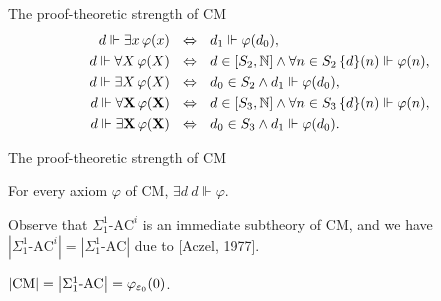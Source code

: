 \documentclass{beamer}
\begin{document}
\begin{frame}{The proof-theoretic strength of $\mathrm{CM}$}
{\begin{align*}
      d \Vdash \exists x \, \varphi\mleft(x\mright) \ \                    & \ratio\Leftrightarrow \ \ d_1 \Vdash \varphi\mleft(d_0\mright),                                                                                                \\
      d \Vdash \forall X \, \varphi\mleft(X\mright) \ \                    & \ratio\Leftrightarrow \ \ d \in \left[S_2, \mathbb{N}\right] \land \forall n \in S_2 \, \mleft\{d\mright\}\mleft(n\mright) \Vdash \varphi\mleft(n\mright),     \\
      d \Vdash \exists X \, \varphi\mleft(X\mright) \ \                    & \ratio\Leftrightarrow \ \ d_0 \in S_2 \land d_1 \Vdash \varphi\mleft(d_0\mright),                                                                              \\
      d \Vdash \forall \mathbf{X} \, \varphi\mleft(\mathbf{X}\mright) \ \  & \ratio\Leftrightarrow \ \ d \in \left[S_3, \mathbb{N}\right] \land \forall n \in S_3 \, \mleft\{d\mright\}\mleft(n\mright) \Vdash \varphi\mleft(n\mright),     \\
      d \Vdash \exists \mathbf{X} \, \varphi\mleft(\mathbf{X}\mright) \ \  & \ratio\Leftrightarrow \ \ d_0 \in S_3 \land d_1 \Vdash \varphi\mleft(d_0\mright).
    \end{align*}}
\end{frame}

\begin{frame}{The proof-theoretic strength of $\mathrm{CM}$}
  \begin{theorem}
    For every axiom $\varphi$ of $\mathrm{CM}$, $\exists d \ d \Vdash \varphi$.
  \end{theorem}

  \vspace*{8pt}

  Observe that $\Sigma^1_1$-$\mathrm{AC}^i$ is an immediate subtheory of $\mathrm{CM}$, and we have $\left|\text{$\Sigma^1_1$-$\mathrm{AC}^i$}\right| = \left|\text{$\Sigma^1_1$-$\mathrm{AC}$}\right|$ due to [Aczel, 1977].

  \vspace*{8pt}

  \begin{corollary}
    $\left|\mathrm{CM}\right| = \left|\text{$\Sigma^1_1$-$\mathrm{AC}$}\right| = \varphi_{\varepsilon_0}\mleft(0\mright)$.
  \end{corollary}

  \nocite{aczel77-martin-lof}
\end{frame}
\end{document}
